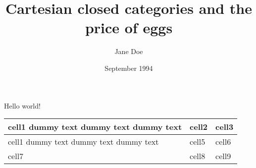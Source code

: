 \documentclass{article}
\title{Cartesian closed categories and the price of eggs}
\author{Jane Doe}
\date{September 1994}
\begin{document}
   \maketitle
   Hello world!
   
\begin{center}
\begin{tabular}{|m{5em}|m{1cm}|m{1cm}|} 
  \hline
  cell1 dummy text dummy text dummy text& cell2 & cell3 \\ \hline
  cell1 dummy text dummy text dummy text & cell5 & cell6 \\ \hline
  cell7 & cell8 & cell9 \\ \hline
\end{tabular}
\end{center}
\end{document}
